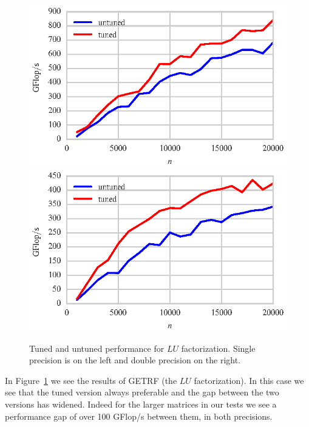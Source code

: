 \documentclass[a4paper,12pt]{article}
\begin{document}
\begin{figure}[ht]
  \centering
  \includegraphics[scale=0.85]{fig/tuned_sgetrf.eps}
  \includegraphics[scale=0.85]{fig/tuned_dgetrf.eps}
  \caption{Tuned and untuned performance for $LU$ factorization. Single
    precision is on the left and double precision on the right.
    \label{fig.tuned_getrf} }
\end{figure}
In Figure~\ref{fig.tuned_getrf} we see the results of
GETRF (the $LU$ factorization).
In this case
we see that the tuned version always preferable
and the gap between the two versions has widened.
Indeed for the larger matrices in our tests we see a
performance gap of over 100 GFlop/s between them,
in both precisions.
\end{document}
